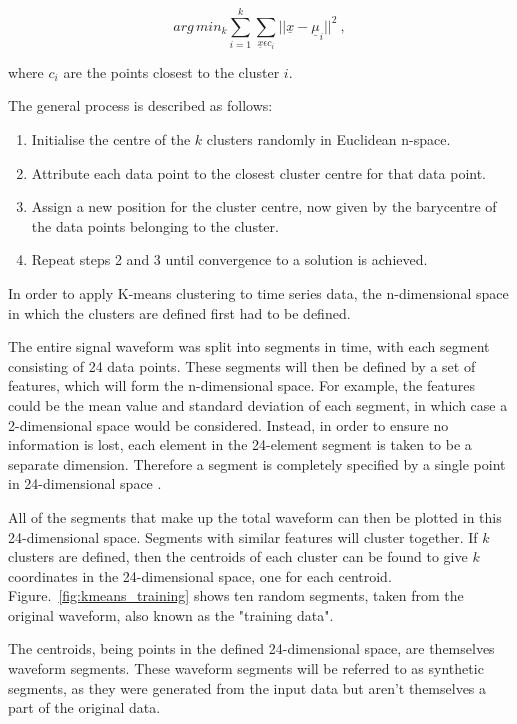\begin{equation}
    arg\,min_k \sum_{i=1}^{k} \sum_{\underline{x} \epsilon c_i} ||\underline{x}-\underline{\mu}_i||^2 ~,
    \label{eq:K-means}
\end{equation}

where $c_i$ are the points closest to the cluster $i$.

The general process is described as follows:
\begin{enumerate}
    \item Initialise the centre of the $k$ clusters randomly in Euclidean n-space.
    \item Attribute each data point to the closest cluster centre for that data point. 
    \item Assign a new position for the cluster centre, now given by the barycentre of the data points belonging to the cluster.
    \item Repeat steps 2 and 3 until convergence to a solution is achieved.
\end{enumerate}

In order to apply K-means clustering to time series data, the n-dimensional space in which the clusters are defined first had to be defined. 

The entire signal waveform was split into segments in time, with each segment consisting of 24 data points. These segments will then be defined by a set of features, which will form the n-dimensional space. For example, the features could be the mean value and standard deviation of each segment, in which case a 2-dimensional space would be considered. Instead, in order to ensure no information is lost, each element in the 24-element segment is taken to be a separate dimension. Therefore a segment is completely specified by a single point in 24-dimensional space \cite{lin_vlachos_keogh_gunopulos_2004}.

All of the segments that make up the total waveform can then be plotted in this 24-dimensional space. Segments with similar features will cluster together. If $k$ clusters are defined, then the centroids of each cluster can be found to give $k$ coordinates in the 24-dimensional space, one for each centroid. Figure.~\ref{fig:kmeans_training} shows ten random segments, taken from the original waveform, also known as the "training data".

The centroids, being points in the defined 24-dimensional space, are themselves waveform segments. These waveform segments will be referred to as synthetic segments, as they were generated from the input data but aren't themselves a part of the original data. 

